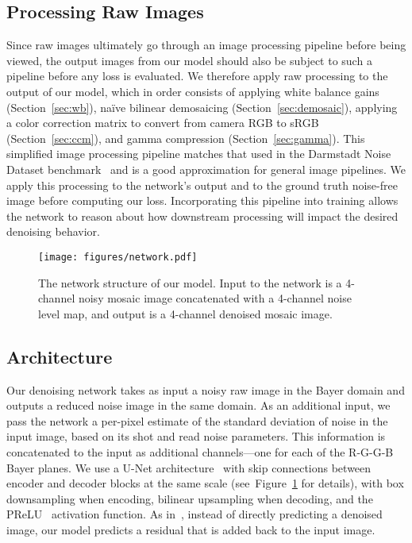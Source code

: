 \documentclass[10pt,twocolumn,letterpaper]{article}
\begin{document}
\subsection{Processing Raw Images}
\label{sec:postproc}

Since raw images ultimately go through an image processing pipeline before being viewed, the output images from our model should also be subject to such a pipeline before any loss is evaluated. We therefore apply raw processing to the output of our model, which in order consists of applying white balance gains (Section~\ref{sec:wb}), na\"ive bilinear demosaicing (Section~\ref{sec:demosaic}), applying a color correction matrix to convert from camera RGB to sRGB (Section~\ref{sec:ccm}), and gamma compression (Section~\ref{sec:gamma}). This simplified image processing pipeline matches that used in the Darmstadt Noise Dataset benchmark~\cite{plotz2017cvpr} and is a good approximation for general image pipelines. We apply this processing to the network's output and to the ground truth noise-free image before computing our loss. Incorporating this pipeline into training allows the network to reason about how downstream processing will impact the desired denoising behavior.


\begin{figure}[t]
\begin{center}
   \texttt{[image: figures/network.pdf]}
\end{center}
   \caption{The network structure of our model. Input to the network is a 4-channel noisy mosaic image concatenated with a 4-channel noise level map, and output is a 4-channel denoised mosaic image.
}
\label{fig:network}
\end{figure}

\subsection{Architecture}
\label{sec:arch}

Our denoising network takes as input a noisy raw image in the Bayer domain and outputs a reduced noise image in the same domain. As an additional input, we pass the network a per-pixel estimate of the standard deviation of noise in the input image, based on its shot and read noise parameters. This information is concatenated to the input as  additional channels---one for each of the R-G-G-B Bayer planes. We use a U-Net architecture~\cite{unet} with skip connections between encoder and decoder blocks at the same scale (see~Figure~\ref{fig:network} for details), with box downsampling when encoding, bilinear upsampling when decoding, and the PReLU~\cite{he2015delving} activation function. 
As in~\cite{Zhang2017}, instead of directly predicting a denoised image, our model predicts a residual that is added back to the input image.
\end{document}
